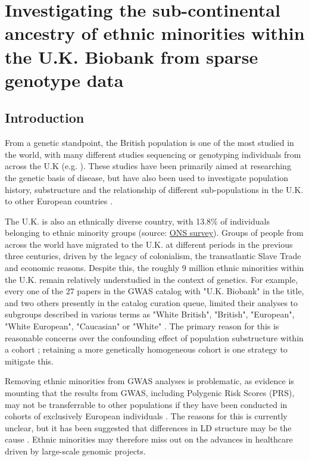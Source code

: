 \chapter{Investigating the sub-continental ancestry of ethnic minorities within the U.K. Biobank from sparse genotype data}
\label{chapterlabel3}

\section{Introduction}

From a genetic standpoint, the British population is one of the most studied in the world, with many different studies sequencing or genotyping individuals from across the U.K (e.g. \cite{bycroft2018UK, Leslie2015, turnbull2018introducing, UK10k2015UK10k}). These studies have been primarily aimed at researching the genetic basis of disease, but have also been used to investigate population history, substructure  and the relationship of different sub-populations in the U.K. to other European countries \cite{Leslie2015, schiffels2016iron, liu2020human}.  

The U.K. is also an ethnically diverse country, with 13.8\% of individuals belonging to ethnic minority groups (source: \href{https://www.ons.gov.U.K./peoplepopulationandcommunity/populationandmigration/populationestimates/articles/researchreportonpopulationestimatesbyethnicgroupandreligion/2019-12-04}{ONS survey}). Groups of people from across the world have migrated to the U.K. at different periods in the previous three centuries, driven by the legacy of colonialism, the transatlantic Slave Trade and economic reasons. Despite this, the roughly 9 million ethnic minorities within the U.K. remain relatively understudied in the context of genetics. For example, every one of the 27 papers in the GWAS catalog with "U.K. Biobank" in the title, and two others presently in the catalog curation queue, limited their analyses to subgroups described in various terms as "White British", "British", "European", "White European", "Caucasian" or "White" \cite{manolio2019using}. The primary reason for this is reasonable concerns over the confounding effect of population substructure within a cohort \cite{hellwege2017population}; retaining a more genetically homogeneous cohort is one strategy to mitigate this. 

Removing ethnic minorities from GWAS analyses is problematic, as evidence is mounting that the results from GWAS, including Polygenic Risk Scores (PRS), may not be transferrable to other populations if they have been conducted in cohorts of exclusively European individuals \cite{kuchenbaecker2019transferability, martin2017human, bustamante2011genomics}. The reasons for this is currently unclear, but it has been suggested that differences in LD structure may be the cause \cite{vilhjalmsson2015modeling}. Ethnic minorities may therefore miss out on the advances in healthcare driven by large-scale genomic projects. 

